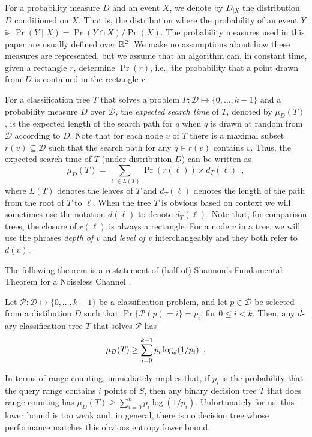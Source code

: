 \documentclass{patmorin}
\newcommand{\depth}{d}
\begin{document}
For a probability measure $D$ and an event $X$, we denote by $D_{|X}$
the distribution $D$ conditioned on $X$.  That is, the distribution where
the probability of an event $Y$ is $\Pr(Y\mid X)=\Pr(Y\cap X)/\Pr(X)$.
The probability measures used in this paper are usually defined over
$\mathbb{R}^2$.  We make no assumptions about how these measures are represented,
but we assume that an algorithm can, in constant time, given a rectangle
$r$, determine $\Pr(r)$, i.e., the probability that a point drawn from
$D$ is contained in the rectangle $r$.

For a classification tree $T$ that solves a problem
$P:\mathcal{D}\mapsto\{0,\ldots,k-1\}$ and a probability measure $D$
over $\mathcal{D}$, the \emph{expected search time} of $T$, denoted by
$\mu_D(T)$, is the expected length of the search path for $q$ when $q$ is
drawn at random from $\mathcal{D}$ according to $D$.  Note that for each
node $v$ of $T$ there is a maximal subset $r(v)\subseteq \mathcal{D}$
such that the search path for any $q\in r(v)$ contains $v$.  Thus,
the expected search time of $T$ (under distribution $D$) can be written as
\[
     \mu_D(T) = \sum_{\ell\in L(T)} \Pr(r(\ell))\times \depth_T(\ell)
	\enspace ,
\]
where $L(T)$ denotes the leaves of $T$ and $\depth_T(\ell)$ denotes the
length of the path from the root of $T$ to $\ell$.  When the tree $T$
is obvious based on context we will sometimes use the notation
$d(\ell)$ to denote $d_T(\ell)$. Note that, for
comparison trees, the closure of $r(\ell)$ is always a rectangle.  For
a node $v$ in a tree, we will use the phrases \emph{depth of $v$} and
\emph{level of $v$} interchangeably and they both refer to $d(v)$. 

The following theorem is a restatement of (half of) Shannon's
Fundamental Theorem for a Noiseless Channel \cite[Theorem 9]{s48}.
\begin{thm}
Let $\mathcal{P}:\mathcal{D}\mapsto \{0,\ldots,k-1\}$ be a classification
problem, and let $p\in \mathcal{D}$ be selected from a distibution $D$ such
that $\Pr\{\mathcal{P}(p)= i\}=p_i$, for $0\le i< k$.  Then, any
$d$-ary classification tree $T$ that solves $\mathcal{P}$ has
\begin{equation}
     \mu_D(T) \ge \sum_{i=0}^{k-1} p_i\log_d(1/p_i) \enspace .
	\eqlabel{shannon}
\end{equation}
\end{thm}

In terms of range counting,  immediately implies that,
if $p_i$ is the probability that the query range contains $i$ points
of $S$, then any binary decision tree $T$ that does range counting has
$\mu_D(T) \ge \sum_{i=0}^{n} p_i\log(1/p_i)$.  Unfortunately for us,
this lower bound is too weak and, in general, there is no decision
tree whose performance matches this obvious entropy lower bound.
\end{document}

